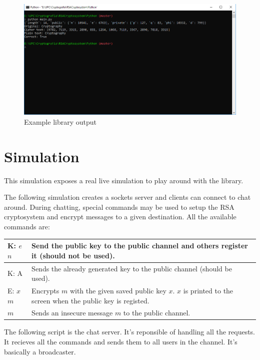 \documentclass[usenames,dvipsnames,12pt]{report}
\begin{document}
\inputminted[linenos, breaklines=true]{python}{../Python/main.py}

\begin{figure}[H]
    \centering
    \includegraphics[width=15cm]{RSA1}
    \caption{Example library output}
\end{figure}

\chapter{Simulation}

This simulation exposes a real live simulation to play around with the library.

The following simulation creates a sockets server and clients can connect to chat around.
During chatting, special commands may be used to setup the RSA cryptosystem and encrypt
messages to a given destination. All the available commands are:

\begin{center}
    \begin{tabular}{ | l | p{6cm} |}
    \hline
    K: $e$ $n$ & Send the public key to the public channel and others register it (should not be used).\\ \hline
    K: A & Sends the already generated key to the public channel (should be used).\\ \hline
    E: $x$ $m$ & Encrypts $m$ with the given saved public key $x$. $x$ is printed to the screen when the public key is registed.\\ \hline
    $m$ & Sends an insecure message $m$ to the public channel.\\
    \hline
    \end{tabular}
\end{center}

The following script is the chat server. It's reponsible of handling all the requests. It recieves all the
commands and sends them to all users in the channel. It's basically a broadcaster.
\end{document}
